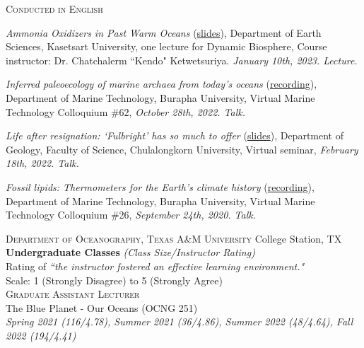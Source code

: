 \documentclass[11pt, letter]{article}
\newcommand{\margintext}[1]{\marginnote{\normalsize\textbf #1 |}}
\begin{document}
\textsc{Conducted in English}
\begin{etaremune}
\item \textit{Ammonia Oxidizers in Past Warm Oceans} (\href{https://tamucs-my.sharepoint.com/:b:/g/personal/rrattan_tamu_edu/ESdkQzE0k-xNufbKOW7oMxwBUtcPdXOOMauWxMsfEqFgkA?e=Xk2nDl}{slides}), Department of Earth Sciences, Kasetsart University, one lecture for Dynamic Biosphere, Course instructor: Dr. Chatchalerm ``Kendo" Ketwetsuriya. \textit{January 10th, 2023. Lecture.}

\item \textit{Inferred paleoecology of marine archaea from today's oceans} (\href{https://fb.watch/grZcLZQSbV/}{recording}), Department of Marine Technology, Burapha University, Virtual Marine Technology Colloquium \#62, \textit{October 28th, 2022. Talk.}

\item \textit{Life after resignation: `Fulbright' has so much to offer} (\href{https://www.canva.com/design/DAE4hfYUXJk/3E9PACt31gAkqAKfjnURkg/edit?utm_content=DAE4hfYUXJk&utm_campaign=designshare&utm_medium=link2&utm_source=sharebutton}{slides}), Department of Geology, Faculty of Science, Chulalongkorn University, Virtual seminar, \textit{February 18th, 2022. Talk.}

\item \textit{Fossil lipids: Thermometers for the Earth's climate history} (\href{https://www.facebook.com/watch/?v=405982837057621}{recording}), Department of Marine Technology, Burapha University, Virtual Marine Technology Colloquium \#26, \textit{September 24th, 2020. Talk.}

\end{etaremune}

\margintext{Teaching}
\textsc{Department of Oceanography, Texas A\&M University} \hfill College Station, TX \\
\textbf{Undergraduate Classes} \textit{(Class Size/Instructor Rating)} \\
\footnotesize 
Rating of \textit{``the instructor fostered an effective learning environment."}\\
Scale: 1 (Strongly Disagree) to 5 (Strongly Agree) \\

\normalsize
\textsc{Graduate Assistant Lecturer} \\
The Blue Planet - Our Oceans (OCNG 251) \\
\textit{Spring 2021 (116/4.78), Summer 2021 (36/4.86), Summer 2022 (48/4.64), Fall 2022 (194/4.41)}
\end{document}
